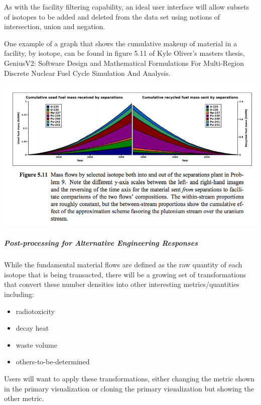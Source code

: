 \documentclass[letterpaper,10pt,english]{sphinxmanual}
\begin{document}
As with the facility filtering capability, an ideal user interface
will allow subsets of isotopes to be added and deleted from the data
set using notions of intersection, union and negation.

One example of a graph that shows the cumulative makeup of material
in a facility, by isotope, can be found in figure 5.11 of Kyle Oliver's
masters thesis, GeniusV2: Software Design and Mathematical Formulations
For Multi-Region Discrete Nuclear Fuel Cycle Simulation And Analysis.

\includegraphics[width=500pt]{cumulative_iso_dist.png}


\subparagraph{Post-processing for Alternative Engineering Responses}
\label{devdoc/output_usecases:post-processing-for-alternative-engineering-responses}
While the fundamental material flows are defined as the raw quantity
of each isotope that is being transacted, there will be a growing set
of transformations that convert these number densities into other
interesting metrics/quantities including:
\begin{itemize}
\item {} 
radiotoxicity

\item {} 
decay heat

\item {} 
waste volume

\item {} 
others-to-be-determined

\end{itemize}

Users will want to apply these transformations, either changing the
metric shown in the primary visualization or cloning the primary
visualization but showing the other metric.
\end{document}
